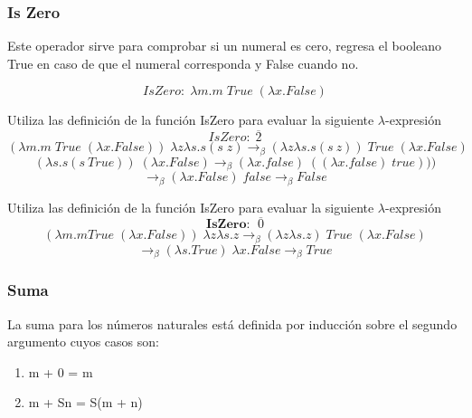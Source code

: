         \subsubsection{Is Zero}
        Este operador sirve para comprobar si un numeral es cero, regresa el booleano True en caso de que el numeral corresponda y False cuando no.\\
        \begin{definition}
            $$IsZero:  \; \lambda m. m\;True \;(\lambda x.False)$$
        \end{definition}

        \begin{exercise}
            Utiliza las definición de la función IsZero para evaluar la siguiente $\lambda$-expresión
            \[
                IsZero:  \; \overline{2}
            \]
            \[
                (\lambda m. m\;True \;(\lambda x.False)) \; \lambda z\lambda s.s(s\;z) \rightarrow_\beta (\lambda z\lambda s.s(s\:z)) \; True \; (\lambda x.False) 
            \]
            \[
                (\lambda s.s(s\: True)) \; (\lambda x.False) \rightarrow_\beta  (\lambda x.false) \; ((\lambda x.false) \; true)))
            \]
            \[
                 \rightarrow_\beta  (\lambda x.False) \; false \rightarrow_\beta False
            \]

        \end{exercise}

        \begin{exercise}
            Utiliza las definición de la función IsZero para evaluar la siguiente $\lambda$-expresión
            \[
                \textbf{IsZero: } \; \overline{0}
            \]
            \[
                (\lambda m. mTrue \; (\lambda x.False)) \; \lambda z\lambda s.z \rightarrow_\beta (\lambda z\lambda s.z) \; True \; (\lambda x.False)
            \]
            \[
                \rightarrow_\beta (\lambda s.True) \; \lambda x.False \rightarrow_\beta True
            \]
        \end{exercise}
        

    \subsubsection{Suma}
        La suma para los números naturales está definida por inducción sobre el segundo argumento cuyos casos son:
        \begin{enumerate}
            \item m + 0 = m 
            \item m + Sn = S(m + n)
        \end{enumerate}

